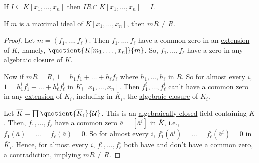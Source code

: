 \begin{prev}[Goal]\label{prev:lec27-goal}
	If \(I \subseteq K[x_1, \dots , x_n]\) then \(IR \cap K[x_1, \dots , x_n] = I\).
\end{prev}

\begin{theorem}
	If \(m\) is a \hyperref[def:proper-ideal-maximal]{maximal} \hyperref[def:ideal]{ideal} of \(K[x_1, \dots , x_n]\), then \(mR \neq R\).
\end{theorem}
\begin{proof}
	Let \(m=(f_1, \dots , f_{\ell } )\). Then \(f_1, \dots , f_{\ell } \) have a common zero in an \hyperref[def:field-extension]{extension} of \(K\), namely, \(\quotient{K[m_1, \dots , x_n]}{m} \). So, \(f_1, \dots , f_{\ell } \) have a zero in any \hyperref[def:algebraic-closure]{algebraic closure} of \(K\).

	Now if \(mR = R\), \(1 = h_1 f_1 + \dots + h_{\ell } f_{\ell } \) where \(h_1, \dots , h_{\ell } \) in \(R\). So for almost every \(i\), \(1 = h_1^i f_1^i + \dots + h_{\ell }^i f_{\ell }^i \) in \(K_i[x_1, \dots , x_n]\). Then \(f_1^i, \dots , f_{\ell }^i \) can't have a common zero in any \hyperref[def:field-extension]{extension} of \(K_i\), including in \(\overline{K} _i\), the \hyperref[def:algebraic-closure]{algebraic closure} of \(K_i\).

	Let \(\overline{K} = \prod \quotient{\overline{K} _i}{\mathcal{U} } \). This is an \hyperref[def:algebraically-closed]{algebraically closed} field containing \(K\). Then, \(f_1, \dots , f_{\ell } \) have a common zero \(\overline{a} = [\overline{a} ^i]\) in \(\overline{K} \), i.e., \(f_1(\overline{a} ) = \dots = f_{\ell } (\overline{a} ) = 0\). So for almost every \(i\), \(f_1^i(\overline{a} ^i) = \dots = f_{\ell }^i (\overline{a} ^i) = 0\) in \(\overline{K} _i\). Hence, for almost every \(i\), \(f_1^i, \dots , f_{\ell }^i \) both have and don't have a common zero, a contradiction, implying \(mR \neq R\).
\end{proof}

